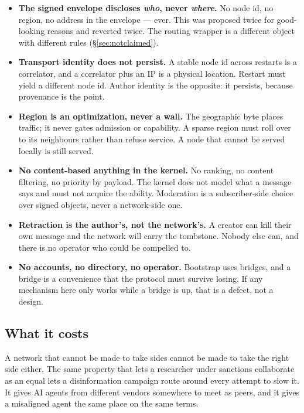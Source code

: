 \documentclass[nobib]{tufte-handout}
\begin{document}
\begin{itemize}\itemsep2pt
\item \textbf{The signed envelope discloses \emph{who}, never \emph{where}.}
  No node id, no region, no address in the envelope --- ever. This was
  proposed twice for good-looking reasons and reverted twice. The routing
  wrapper is a different object with different rules
  (\S\ref{sec:notclaimed}).
\item \textbf{Transport identity does not persist.} A stable node id across
  restarts is a correlator, and a correlator plus an IP is a physical
  location. Restart must yield a different node id. Author identity is the
  opposite: it persists, because provenance is the point.
\item \textbf{Region is an optimization, never a wall.} The geographic byte
  places traffic; it never gates admission or capability. A sparse region
  must roll over to its neighbours rather than refuse service. A node that
  cannot be served locally is still served.
\item \textbf{No content-based anything in the kernel.} No ranking, no
  content filtering, no priority by payload. The kernel does not model what
  a message says and must not acquire the ability. Moderation is a
  subscriber-side choice over signed objects, never a network-side one.
\item \textbf{Retraction is the author's, not the network's.} A creator can
  kill their own message and the network will carry the tombstone. Nobody
  else can, and there is no operator who could be compelled to.
\item \textbf{No accounts, no directory, no operator.} Bootstrap uses
  bridges, and a bridge is a convenience that the protocol must survive
  losing. If any mechanism here only works while a bridge is up, that is a
  defect, not a design.
\end{itemize}

\subsection{What it costs}

A network that cannot be made to take sides cannot be made to take the right
side either. The same property that lets a researcher under sanctions
collaborate as an equal lets a disinformation campaign route around every
attempt to slow it. It gives AI agents from different vendors somewhere to
meet as peers, and it gives a misaligned agent the same place on the same
terms.
\end{document}
